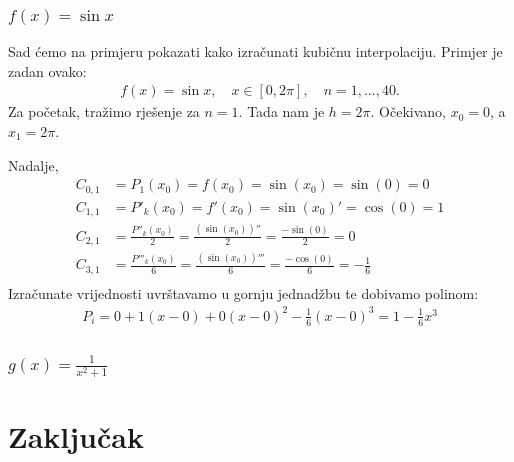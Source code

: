 \documentclass[12pt,a4paper]{report}
\begin{document}
		\subsection{$f(x)=\sin x$}
		Sad ćemo na primjeru pokazati kako izračunati kubičnu interpolaciju. Primjer je zadan ovako:
		\begin{align*}
			f(x)=\sin x, \quad x\in [0, 2\pi], \quad n=1,...,40.
		\end{align*}
		Za početak, tražimo rješenje za $n=1$. Tada nam je $h=2\pi$. Očekivano, $x_0 = 0$, a $x_1 = 2\pi$.  
		
		Nadalje,
		\begin{align*}
			C_{0,1}&=P_1(x_0)=f(x_0)=\sin (x_0)=\sin (0) = 0\\
			C_{1,1}&=P'_k(x_0)=f'(x_0)=\sin(x_0)'=\cos(0) =1\\
			C_{2, 1}&=\frac{P''_k(x_0)}{2}=\frac{(\sin (x_0))''}{2}=\frac{-\sin(0)}{2}=0\\
			C_{3, 1}&=\frac{P'''_k(x_0)}{6}=\frac{(\sin (x_0))'''}{6}=\frac{-\cos(0)}{6}=-\frac{1}{6}\\
		\end{align*}
		Izračunate vrijednosti uvrštavamo u gornju jednadžbu te dobivamo polinom:
		\begin{align*}
			P_i=0+1(x-0)+0(x-0)^2-\frac{1}{6}(x-0)^3 = 1-\frac{1}{6}x^3
		\end{align*}
		
		\subsection{$g(x)=\frac{1}{x^2 +1}$}
\chapter{Zaključak}
\end{document}
